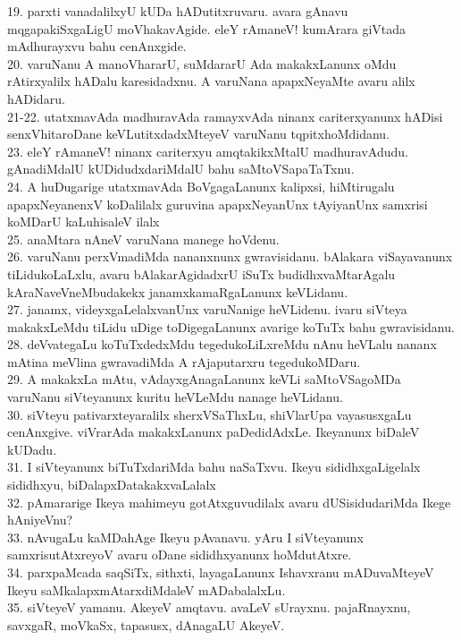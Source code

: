\documentclass{article}
\begin{document}
19. parxti vanadalilxyU kUDa hADutitxruvaru. avara gAnavu mqgapakiSxgaLigU moVhakavAgide. eleY rAmaneV! kumArara giVtada mAdhurayxvu bahu cenAnxgide.\\
20. varuNanu A manoVhararU, suMdararU Ada makakxLanunx oMdu rAtirxyalilx hADalu karesidadxnu. A varuNana apapxNeyaMte avaru alilx hADidaru.\\
21-22. utatxmavAda madhuravAda ramayxvAda ninanx cariterxyanunx hADisi senxVhitaroDane keVLutitxdadxMteyeV varuNanu tqpitxhoMdidanu.\\
23. eleY rAmaneV! ninanx cariterxyu amqtakikxMtalU madhuravAdudu. gAnadiMdalU kUDidudxdariMdalU bahu saMtoVSapaTaTxnu.\\
24. A huDugarige utatxmavAda BoVgagaLanunx kalipxsi, hiMtirugalu apapxNeyanenxV koDalilalx guruvina apapxNeyanUnx tAyiyanUnx samxrisi koMDarU kaLuhisaleV ilalx\\
25. anaMtara nAneV varuNana manege hoVdenu.\\
26. varuNanu perxVmadiMda nananxnunx gwravisidanu. bAlakara viSayavanunx tiLidukoLaLxlu, avaru bAlakarAgidadxrU iSuTx budidhxvaMtarAgalu kAraNaveVneMbudakekx janamxkamaRgaLanunx keVLidanu.\\
27. janamx, videyxgaLelalxvanUnx varuNanige heVLidenu. ivaru siVteya makakxLeMdu tiLidu uDige toDigegaLanunx avarige koTuTx bahu gwravisidanu.\\
28. deVvategaLu koTuTxdedxMdu tegedukoLiLxreMdu nAnu heVLalu nananx mAtina meVlina gwravadiMda A rAjaputarxru tegedukoMDaru.\\
29. A makakxLa mAtu, vAdayxgAnagaLanunx keVLi saMtoVSagoMDa varuNanu siVteyanunx kuritu heVLeMdu nanage heVLidanu.\\
30. siVteyu pativarxteyaralilx sherxVSaThxLu, shiVlarUpa vayasusxgaLu cenAnxgive. viVrarAda makakxLanunx paDedidAdxLe. Ikeyanunx biDaleV kUDadu.\\
31. I siVteyanunx biTuTxdariMda bahu naSaTxvu. Ikeyu sididhxgaLigelalx sididhxyu, biDalapxDatakakxvaLalalx\\
32. pAmararige Ikeya mahimeyu gotAtxguvudilalx avaru dUSisidudariMda Ikege hAniyeVnu?\\
33. nAvugaLu kaMDahAge Ikeyu pAvanavu. yAru I siVteyanunx samxrisutAtxreyoV avaru oDane sididhxyanunx hoMdutAtxre.\\
34. parxpaMcada saqSiTx, sithxti, layagaLanunx Ishavxranu mADuvaMteyeV Ikeyu saMkalapxmAtarxdiMdaleV mADabalalxLu.\\
35. siVteyeV yamanu. AkeyeV amqtavu. avaLeV sUrayxnu. pajaRnayxnu, savxgaR, moVkaSx, tapasusx, dAnagaLU AkeyeV.\\
\end{document}
